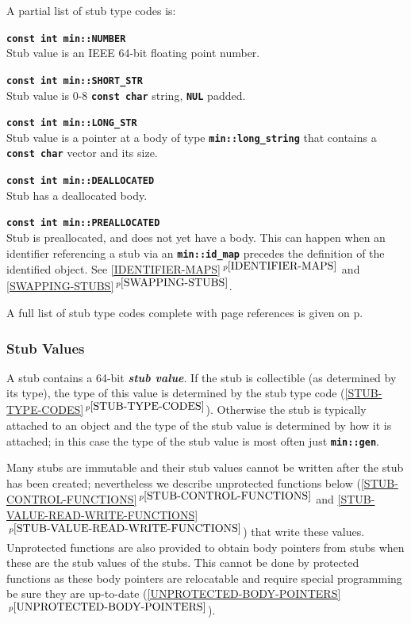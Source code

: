 \documentclass[12pt]{article}
\newcommand{\TT}[1]{{\tt \bfseries #1}}
\newcommand{\key}[1]{{\bf \em #1}\index{#1}}
\newcommand{\itemref}[1]{\ref{#1}$\,^{p\pageref{#1}}$}
\newcommand{\pagref}[1]{p\pageref{#1}}
\newcommand{\EOL}{\penalty \exhyphenpenalty}
\newenvironment{indpar}[1][0.3in]%
	{\begin{list}{}%
		     {\setlength{\itemsep}{0in}%
		      \setlength{\topsep}{0in}%
		      \setlength{\parsep}{1ex}%
		      \setlength{\labelwidth}{#1}%
		      \setlength{\leftmargin}{#1}%
		      \addtolength{\leftmargin}{\labelsep}}%
	 \item}%
	{\end{list}}
\begin{document}
A partial list of stub type codes is:

\begin{indpar}
\begin{list}{}{}
\item[\TT{const int min::NUMBER}]~\\
Stub value is an IEEE 64-bit floating point number.
\item[\TT{const int min::SHORT\_STR}]~\\
Stub value is 0-8 \TT{const char} string, \TT{NUL} padded.
\item[\TT{const int min::LONG\_STR}]~\\
Stub value is a pointer at a body of type \TT{min::long\_\EOL string}
that contains a \TT{const char} vector and its size. 
\item[\TT{const int min::DEALLOCATED}]~\\
Stub has a deallocated body.
\item[\TT{const int min::PREALLOCATED}]~\\
Stub is preallocated, and does not yet have a body.
This can happen when an identifier referencing a stub via
an \TT{min::\EOL id\_\EOL map} precedes the definition of the
identified object.  See \itemref{IDENTIFIER-MAPS} and
\itemref{SWAPPING-STUBS}.

\end{list}
\end{indpar}

A full list of stub type codes complete with page references
is given on \pagref{STUB-TYPE-CODE-LIST}.

\subsubsection{Stub Values}
\label{STUB-VALUES}

A stub contains a 64-bit \key{stub value}.  If the stub is collectible
(as determined by its type), the type of this value
is determined by the stub type code (\itemref{STUB-TYPE-CODES}).
Otherwise the stub is typically attached to an object and the type of the stub
value is determined by how it is attached; in this case the type of the
stub value is most often just \TT{min::gen}.

Many stubs are immutable
and their stub values cannot be written after the stub has been created;
nevertheless we describe unprotected functions
below (\itemref{STUB-CONTROL-FUNCTIONS} and
\itemref{STUB-VALUE-READ-WRITE-FUNCTIONS}) that
write these values.  Unprotected functions are also provided to obtain
body pointers from stubs when these are the stub values of the stubs.
This cannot be done by protected
functions as these body pointers are relocatable and require special
programming be sure they are up-to-date (\itemref{UNPROTECTED-BODY-POINTERS}).
\end{document}
